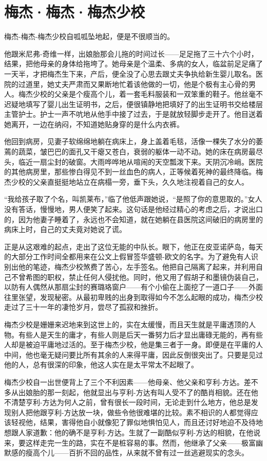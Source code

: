 \chapter{梅杰·梅杰·梅杰少校}
 
    梅杰-梅杰-梅杰少校自呱呱坠地起，便是不很顺当的。

    他跟米尼弗-奇维一样，出娘胎那会儿拖的时间过长——足足拖了三十六个小时，结果，把他母亲的身体给拖垮了。她母亲是个温柔、多病的女人，临盆前足足痛了一天半，才把梅杰生下来，产后，便全没了心思去跟丈夫争执给新生婴儿取名。医院的过道里，她丈夫严肃而又果断地忙着该他做的一切，他是个极有主心骨的男人。梅杰少校的父亲是个瘦高个儿，着一套毛料服装和一双笨重的鞋子。他丝毫不迟疑地填写了婴儿出生证明书，之后，便很镇静地把填好了的出生证明书交给楼层主管护士。护士一声不吭地从他手中接了过去，于是就放轻脚步走开了。他目送着她离开，一边在纳闷，不知道她贴身穿的是什么内衣裤。

    他回到病房，见妻子软绵绵地躺在病床上，身上盖着毛毯，活像一棵失了水分的萎蔫的蔬菜，皱巴巴的面孔又干瘪又苍白，衰弱的躯体一动不动。她的床在病房最尽头，临近一扇尘封的破窗。大雨哗哗地从喧闹的天空瓢泼下来。天阴沉冷峭。医院的其他病房里，那些惨白得见不到一丝血色的病人，正等候着死神的最终降临。梅杰少校的父亲直挺挺地站立在病榻一旁，垂下头，久久地注视着自己的女人。

    “我给孩子取了个名，叫凯莱布，”临了他低声跟她说，“是照了你的意思取的。”女人没有答话，慢慢地，男人便笑了起来。这句话是他经过精心的考虑之后，才说出口的，因为他妻子睡着了，永远也不会知道，就在她躺在县医院这间破旧的病房里的病床上时，自己的丈夫竟对她说了谎。

    正是从这艰难的起点，走出了这位无能的中队长。眼下，他正在皮亚诺萨岛，每天的大部分工作时间全都用来在公文上假冒签华盛顿-欧文的名字。为了避免有人识别出他的笔迹，梅杰少校煞费了苦心，左手签名。他把自己隔离了起来，并利用自己不曾希图的职权，禁止任何人侵扰他。同时，他又用了假胡子和墨镜伪装自己，以防有人偶然从那扇尘封的赛璐珞窗户——有个小偷在上面挖了一道口子——外面往里张望，发现秘密。从最初卑贱的出身到取得如今不怎么起眼的成功，梅杰少校走过了三十一年的凄怆岁月，尝尽了孤寂和挫折。

 


    梅杰少校是姗姗来迟地来到这世上的，实在太缓慢，而且天生就是平庸透顶的人物。有些人是天生的庸才，有些人则是后天一番努力后才显出庸碌无能的，再有些人却是被迫平庸地过活的。至于梅杰少校，他是集三者于一身。即便是在平庸的人中间，他也毫无疑问要比所有其余的人来得平庸，因此反倒很突出了。只要是见过他的人，总有很深的印象，他这人实在是太平常太不起眼了。

    梅杰少校自一出世便背上了三个不利因素——他母亲、他父亲和亨利-方达。差不多从出娘胎的那一刻起，他就显出与亨利-方达有叫人受不了的酷肖相貌。还在他不清楚亨利-方达为何人之前，曾有很长一段时间，无论走到什么地方，他总是发现别人把他跟亨利-方达放一块，做些令他很难堪的比较。素不相识的人都觉得应该轻视他，结果，害得他自小就像犯了罪似地惧怕见人，而且还讨好地迫不及待地想跟人家道歉：他的确不是亨利-方达。生就了一副酷似亨利-方达的相貌，在他说来，要这样走完一生的路，实在不是桩容易的事。然而，他继承了父亲——极富幽默感的瘦高个儿——百折不回的品性，从来就不曾有过一丝逃避现实的念头。

